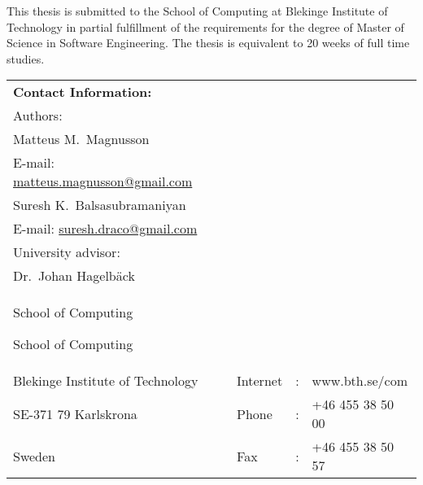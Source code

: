 {\pagestyle{empty}
\changepage{5cm}{1cm}{-0.5cm}{-0.5cm}{}{-2cm}{}{}{}
\noindent%
{\small This thesis is submitted to the School of Computing at Blekinge
Institute of Technology in partial fulfillment of the requirements for the degree of Master
of Science in Software Engineering. The thesis is equivalent to 20 weeks of
full time studies.}
\par\vspace {12cm}

\noindent%
\begin{tabular}{p{}lcl}
\textbf{Contact Information:}\\
Authors:\\
Matteus M.\ Magnusson\\
E-mail: \href{mailto:matteus.magnusson@gmail.com}{matteus.magnusson@gmail.com}\\
\par\vspace {0.5em}
Suresh K.\ Balsasubramaniyan\\
E-mail: \href{mailto:suresh.draco@gmail.com}{suresh.draco@gmail.com}\\
\par\vspace {4cm}
University advisor:\\
Dr.\ Johan Hagelbäck\\
School of Computing
\par\vspace {1cm}
\noindent%
School of Computing \\
Blekinge Institute of Technology & Internet & : & www.bth.se/com\\
SE-371 79 Karlskrona & Phone	& : & +46 455 38 50 00 \\
Sweden & Fax & : & +46 455 38 50 57 \\
\end{tabular}
\clearpage
} %

